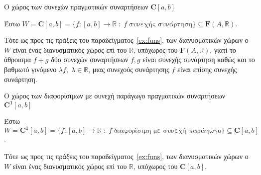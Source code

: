 \documentclass[a4paper,table]{report}
\begin{document}
\begin{example}
  \textcolor{Col2}{Ο χώρος των συνεχών πραγματικών συναρτήσεων 
  $ \mathbf{C}[a,b] $} 

  Έστω $ W = \mathbf{C}{[a,b]} = \{ f \colon [a,b] \to \mathbb{R} \; 
  : \; f \; \text{συνεχής συνάρτηση} \} \subseteq 
  \mathbf{F}(A, \mathbb{R}) $. 

  Τότε ως προς τις πράξεις του 
  παραδείγματος~\ref{ex:funs}, των διανυσματικών χώρων ο $W$ 
  είναι ένας διανυσματικός χώρος επί του $ \mathbb{R} $, υπόχωρος του 
  $\mathbf{F}(A, \mathbb{R})$,
  γιατί το άθροισμα $ f+g $ δύο συνεχών συναρτήσεων $ f,g $ είναι 
  συνεχής συνάρτηση καθώς και το βαθμωτό γινόμενο 
  $ \lambda f, \; \lambda \in \mathbb{R} $, μιας συνεχούς συνάρτησης 
  $f$ είναι επίσης συνεχής συνάρτηση. 
\end{example}

\begin{example}\label{ex:c1} 
  \textcolor{Col2}{Ο χώρος των διαφορίσιμων με 
  συνεχή παράγωγο πραγματικών συναρτήσεων $ \mathbf{C^{1}}[a,b] $} 

  Έστω $ W = \mathbf{C^{1}}{[a,b]} = \{ f \colon [a,b] \to \mathbb{R} \; 
  : \; f \; \text{διαφορίσιμη με συνεχή παράγωγο} \} \subseteq 
  \mathbf{C}[a,b] $. 

  Τότε ως προς τις πράξεις του 
  παραδείγματος~\ref{ex:funs}, των διανυσματικών χώρων ο $W$ 
  είναι ένας διανυσματικός χώρος επί του $ \mathbb{R} $, υπόχωρος του 
  $ \mathbf{C}[a,b] $.
\end{example}

\end{document}
